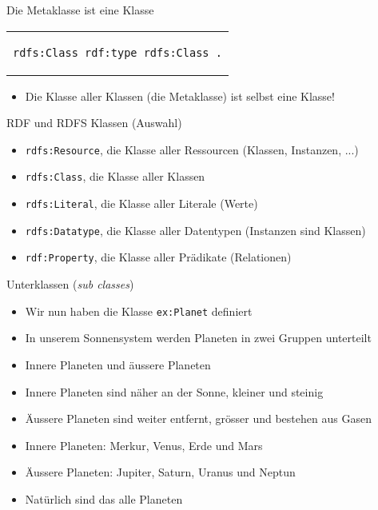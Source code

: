 \documentclass{beamer}
\begin{document}
\begin{frame}[fragile]{Die Metaklasse ist eine Klasse}
	
	\begin{center}
		\begin{tabular}{c}
			\begin{lstlisting}
rdfs:Class rdf:type rdfs:Class .
			\end{lstlisting}
		\end{tabular}
	\end{center}
	
	\vspace{0.5cm}
	
	\begin{itemize}
		\item Die Klasse aller Klassen (die Metaklasse) ist selbst eine Klasse!
	\end{itemize}
	
\end{frame}

\begin{frame}{RDF und RDFS Klassen (Auswahl)}
	
	\begin{itemize}
		\item \texttt{rdfs:Resource}, die Klasse aller Ressourcen (Klassen, Instanzen, ...)
		\item \texttt{rdfs:Class}, die Klasse aller Klassen
		\item \texttt{rdfs:Literal}, die Klasse aller Literale (Werte)
		\item \texttt{rdfs:Datatype}, die Klasse aller Datentypen (Instanzen sind Klassen)
		\item \texttt{rdf:Property}, die Klasse aller Prädikate (Relationen)
	\end{itemize}
	
\end{frame}

\begin{frame}{Unterklassen (\emph{sub classes})}
	
	\begin{itemize}
		\item Wir nun haben die Klasse \texttt{ex:Planet} definiert
		\item In unserem Sonnensystem werden Planeten in zwei Gruppen unterteilt
		\item Innere Planeten und äussere Planeten
		\item Innere Planeten sind näher an der Sonne, kleiner und steinig
		\item Äussere Planeten sind weiter entfernt, grösser und bestehen aus Gasen
		\item Innere Planeten: Merkur, Venus, Erde und Mars
		\item Äussere Planeten: Jupiter, Saturn, Uranus und Neptun
		\item Natürlich sind das alle Planeten
	\end{itemize}
	
\end{frame}
\end{document}
